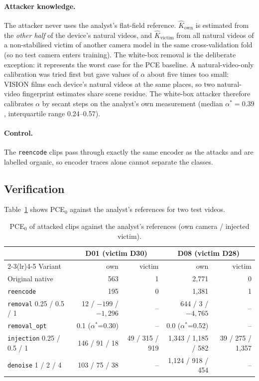 \documentclass[11pt,a4paper]{article}
\begin{document}
\paragraph{Attacker knowledge.} The attacker never uses the analyst's flat-field reference.
$\hat K_{\text{own}}$ is estimated from the \emph{other half} of the device's natural videos, and
$\hat K_{\text{victim}}$ from all natural videos of a non-stabilised victim of another camera model in the
same cross-validation fold (so no test camera enters training). The white-box removal is the
deliberate exception: it represents the worst case for the PCE baseline. A natural-video-only
calibration was tried first but gave values of $\alpha$ about five times too small: VISION films each
device's natural videos at the same places, so two natural-video fingerprint estimates share scene
residue. The white-box attacker therefore calibrates $\alpha$ by secant steps on the analyst's own
measurement (median $\alpha^\ast = 0.39$, interquartile range 0.24--0.57).

\paragraph{Control.} The \texttt{reencode} clips pass through exactly the same encoder as the attacks
and are labelled organic, so encoder traces alone cannot separate the classes.

\subsection{Verification}
Table~\ref{tab:attackcheck} shows PCE$_0$ against the analyst's references for two test videos.

\begin{table}[H]
\centering\small\setlength{\tabcolsep}{4.5pt}
\caption{PCE$_0$ of attacked clips against the analyst's references (own camera / injected victim).}
\label{tab:attackcheck}
\begin{tabular}{lrrrr}
\toprule
& \multicolumn{2}{c}{D01 (victim D30)} & \multicolumn{2}{c}{D08 (victim D28)} \\
\cmidrule(lr){2-3}\cmidrule(lr){4-5}
Variant & own & victim & own & victim \\
\midrule
Original native        & 563   & 1    & 2{,}771  & 0 \\
\texttt{reencode}      & 195   & 0    & 1{,}381  & 1 \\
\texttt{removal} 0.25 / 0.5 / 1 & 12 / $-199$ / $-1{,}296$ & -- & 644 / 3 / $-4{,}765$ & -- \\
\texttt{removal\_opt}  & 0.1 ($\alpha^\ast$=0.30) & -- & 0.0 ($\alpha^\ast$=0.52) & -- \\
\texttt{injection} 0.25 / 0.5 / 1 & 146 / 91 / 18 & 49 / 315 / 919 & 1{,}343 / 1{,}185 / 582 & 39 / 275 / 1{,}357 \\
\texttt{denoise} 1 / 2 / 4 & 103 / 75 / 38 & -- & 1{,}124 / 918 / 454 & -- \\
\bottomrule
\end{tabular}
\end{table}
\end{document}
